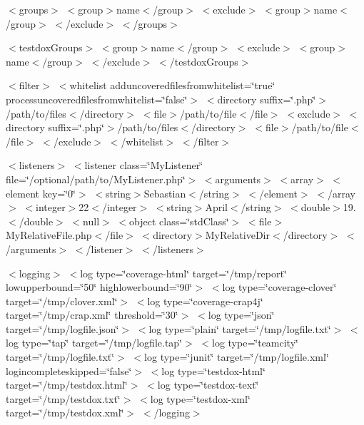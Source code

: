 {\ttfamily  $<$groups$>$  $<$group$>$name$<$/group$>$  $<$exclude$>$ $<$group$>$name$<$/group$>$ $<$/exclude$>$ $<$/groups$>$}

{\ttfamily  $<$testdox\+Groups$>$  $<$group$>$name$<$/group$>$  $<$exclude$>$ $<$group$>$name$<$/group$>$ $<$/exclude$>$ $<$/testdox\+Groups$>$}

{\ttfamily  $<$filter$>$ $<$whitelist adduncoveredfilesfromwhitelist=\char`\"{}true\char`\"{} processuncoveredfilesfromwhitelist=\char`\"{}false\char`\"{}$>$ $<$directory suffix=\char`\"{}.\+php\char`\"{}$>$/path/to/files$<$/directory$>$ $<$file$>$/path/to/file$<$/file$>$ $<$exclude$>$ $<$directory suffix=\char`\"{}.\+php\char`\"{}$>$/path/to/files$<$/directory$>$ $<$file$>$/path/to/file$<$/file$>$ $<$/exclude$>$ $<$/whitelist$>$ $<$/filter$>$}

{\ttfamily  $<$listeners$>$ $<$listener class=\char`\"{}\+My\+Listener\char`\"{} file=\char`\"{}/optional/path/to/\+My\+Listener.\+php\char`\"{}$>$ $<$arguments$>$ $<$array$>$ $<$element key=\char`\"{}0\char`\"{}$>$ $<$string$>$Sebastian$<$/string$>$ $<$/element$>$ $<$/array$>$ $<$integer$>$22$<$/integer$>$ $<$string$>$April$<$/string$>$ $<$double$>$19.$<$/double$>$ $<$null$>$ $<$object class=\char`\"{}std\+Class\char`\"{}$>$ $<$file$>$My\+Relative\+File.\+php$<$/file$>$ $<$directory$>$My\+Relative\+Dir$<$/directory$>$ $<$/arguments$>$ $<$/listener$>$ $<$/listeners$>$}

{\ttfamily  $<$logging$>$ $<$log type=\char`\"{}coverage-\/html\char`\"{} target=\char`\"{}/tmp/report\char`\"{} lowupperbound=\char`\"{}50\char`\"{} highlowerbound=\char`\"{}90\char`\"{}$>$ $<$log type=\char`\"{}coverage-\/clover\char`\"{} target=\char`\"{}/tmp/clover.\+xml\char`\"{}$>$ $<$log type=\char`\"{}coverage-\/crap4j\char`\"{} target=\char`\"{}/tmp/crap.\+xml\char`\"{} threshold=\char`\"{}30\char`\"{}$>$ $<$log type=\char`\"{}json\char`\"{} target=\char`\"{}/tmp/logfile.\+json\char`\"{}$>$ $<$log type=\char`\"{}plain\char`\"{} target=\char`\"{}/tmp/logfile.\+txt\char`\"{}$>$ $<$log type=\char`\"{}tap\char`\"{} target=\char`\"{}/tmp/logfile.\+tap\char`\"{}$>$ $<$log type=\char`\"{}teamcity\char`\"{} target=\char`\"{}/tmp/logfile.\+txt\char`\"{}$>$ $<$log type=\char`\"{}junit\char`\"{} target=\char`\"{}/tmp/logfile.\+xml\char`\"{} logincompleteskipped=\char`\"{}false\char`\"{}$>$ $<$log type=\char`\"{}testdox-\/html\char`\"{} target=\char`\"{}/tmp/testdox.\+html\char`\"{}$>$ $<$log type=\char`\"{}testdox-\/text\char`\"{} target=\char`\"{}/tmp/testdox.\+txt\char`\"{}$>$ $<$log type=\char`\"{}testdox-\/xml\char`\"{} target=\char`\"{}/tmp/testdox.\+xml\char`\"{}$>$ $<$/logging$>$}

